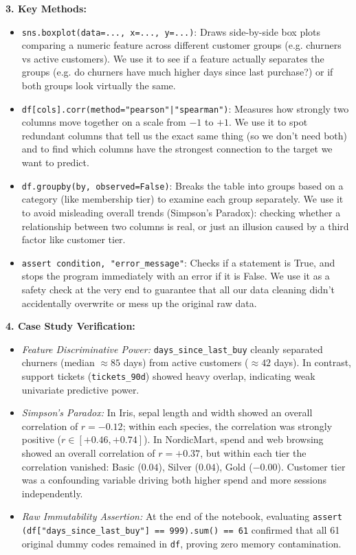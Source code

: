 \documentclass[11pt,a4paper]{article}
\let\oldtexttt\texttt
\renewcommand{\texttt}[1]{{\color{codebase}\oldtexttt{#1}}}
\begin{document}
\vspace{0.4em}
\noindent\textbf{3. Key Methods:}\par\vspace{0.2em}
\begin{itemize}[leftmargin=*]
    \item \lstinline!sns.boxplot(data=..., x=..., y=...)!: Draws side-by-side box plots comparing a numeric feature across different customer groups (e.g. churners vs active customers). We use it to see if a feature actually separates the groups (e.g. do churners have much higher days since last purchase?) or if both groups look virtually the same.
    \item \lstinline!df[cols].corr(method="pearson"|"spearman")!: Measures how strongly two columns move together on a scale from $-1$ to $+1$. We use it to spot redundant columns that tell us the exact same thing (so we don't need both) and to find which columns have the strongest connection to the target we want to predict.
    \item \lstinline!df.groupby(by, observed=False)!: Breaks the table into groups based on a category (like membership tier) to examine each group separately. We use it to avoid misleading overall trends (Simpson's Paradox): checking whether a relationship between two columns is real, or just an illusion caused by a third factor like customer tier.
    \item \lstinline!assert condition, "error_message"!: Checks if a statement is True, and stops the program immediately with an error if it is False. We use it as a safety check at the very end to guarantee that all our data cleaning didn't accidentally overwrite or mess up the original raw data.
\end{itemize}

\vspace{0.4em}
\noindent\textbf{4. Case Study Verification:}\par\vspace{0.2em}
\begin{itemize}[leftmargin=*]
    \item \textit{Feature Discriminative Power:} \lstinline!days_since_last_buy! cleanly separated churners (median $\approx 85$ days) from active customers ($\approx 42$ days). In contrast, support tickets (\texttt{tickets_90d}) showed heavy overlap, indicating weak univariate predictive power.
    \item \textit{Simpson's Paradox:} In Iris, sepal length and width showed an overall correlation of $r = -0.12$; within each species, the correlation was strongly positive ($r \in [+0.46, +0.74]$). In NordicMart, spend and web browsing showed an overall correlation of $r = +0.37$, but within each tier the correlation vanished: Basic ($0.04$), Silver ($0.04$), Gold ($-0.00$). Customer tier was a confounding variable driving both higher spend and more sessions independently.
    \item \textit{Raw Immutability Assertion:} At the end of the notebook, evaluating \lstinline!assert (df["days_since_last_buy"] == 999).sum() == 61! confirmed that all 61 original dummy codes remained in \lstinline!df!, proving zero memory contamination.
\end{itemize}
\end{document}
